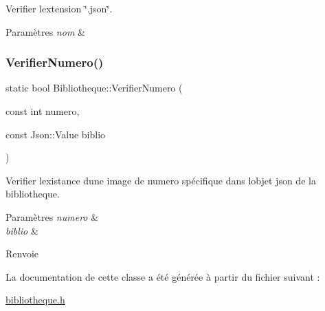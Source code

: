 Verifier l\textquotesingle{}extension \char`\"{}.\+json\char`\"{}. 


\begin{DoxyParams}{Paramètres}
{\em nom} & \\
\hline
\end{DoxyParams}
\mbox{\label{classBibliotheque_a66606b7018ddd339af2a608ea4e6de9c}} 
\subsubsection{\texorpdfstring{Verifier\+Numero()}{VerifierNumero()}}
{\footnotesize\ttfamily static bool Bibliotheque\+::\+Verifier\+Numero (\begin{DoxyParamCaption}\item[{const int}]{numero,  }\item[{const Json\+::\+Value}]{biblio }\end{DoxyParamCaption})\hspace{0.3cm}{\ttfamily [static]}}



Verifier l\textquotesingle{}existance d\textquotesingle{}une image de numero spécifique dans l\textquotesingle{}objet json de la bibliotheque. 


\begin{DoxyParams}{Paramètres}
{\em numero} & \\
\hline
{\em biblio} & \\
\hline
\end{DoxyParams}
\begin{DoxyReturn}{Renvoie}

\end{DoxyReturn}


La documentation de cette classe a été générée à partir du fichier suivant \+:\begin{DoxyCompactItemize}
\item 
\hyperlink{bibliotheque_8h}{bibliotheque.\+h}\end{DoxyCompactItemize}
